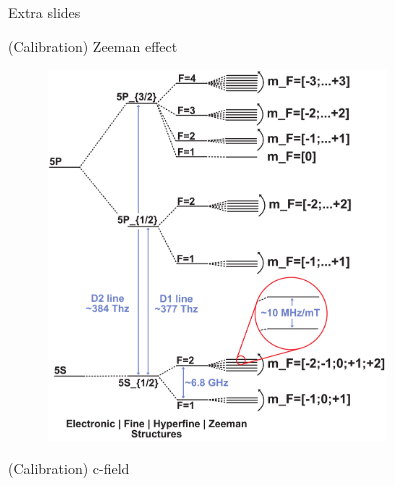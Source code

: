 \begin{frame}[standout]
    Extra slides
\end{frame}


\begin{frame}{(Calibration) Zeeman effect}

    \begin{figure}
        \centering
        \includegraphics[width=0.8\textwidth]{pdf/structure.pdf}
    \end{figure}

\end{frame}



\begin{frame}{(Calibration) c-field}

\end{frame}